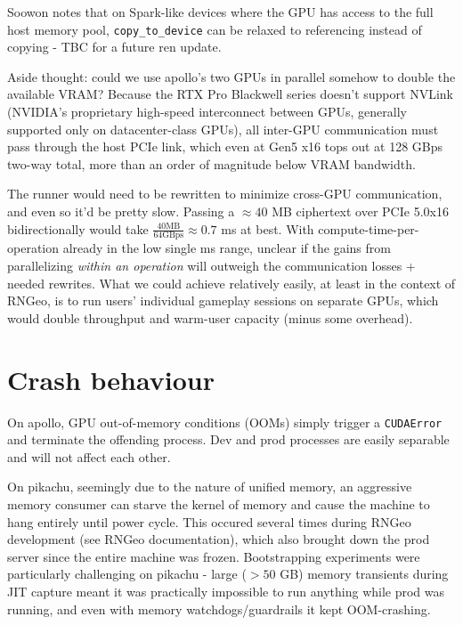 \documentclass{article}
\begin{document}
\vspace{0.2cm}
\noindent{}
\vspace{0.2cm}

Soowon notes that on Spark-like devices where the GPU has access to the full host memory pool, \verb|copy_to_device| can be relaxed to referencing instead of copying - TBC for a future ren update.

Aside thought: could we use apollo's two GPUs in parallel somehow to double the available VRAM? 
Because the RTX Pro Blackwell series doesn't support NVLink (NVIDIA's proprietary high-speed interconnect between GPUs, generally supported only on datacenter-class GPUs), all inter-GPU communication must pass through the host PCIe link, which even at Gen5 x16 tops out at 128 GBps two-way total, more than an order of magnitude below VRAM bandwidth.

The runner would need to be rewritten to minimize cross-GPU communication, and even so it'd be pretty slow. 
Passing a $\approx 40$ MB ciphertext over PCIe 5.0x16 bidirectionally would take $\frac{40 \text{MB}}{64 \text{GBps}} \approx 0.7$ ms at best. 
With compute-time-per-operation already in the low single ms range, unclear if the gains from parallelizing \textit{within an operation} will outweigh the communication losses + needed rewrites. 
What we could achieve relatively easily, at least in the context of RNGeo, is to run users' individual gameplay sessions on separate GPUs, which would double throughput and warm-user capacity (minus some overhead).

\section{Crash behaviour}
On apollo, GPU out-of-memory conditions (OOMs) simply trigger a \verb|CUDAError| and terminate the offending process.
Dev and prod processes are easily separable and will not affect each other.

On pikachu, seemingly due to the nature of unified memory, an aggressive memory consumer can starve the kernel of memory and cause the machine to hang entirely until power cycle. 
This occured several times during RNGeo development (see RNGeo documentation), which also brought down the prod server since the entire machine was frozen.
Bootstrapping experiments were particularly challenging on pikachu - large ($>50$ GB) memory transients during JIT capture meant it was practically impossible to run anything while prod was running, and even with memory watchdogs/guardrails it kept OOM-crashing.
\end{document}
